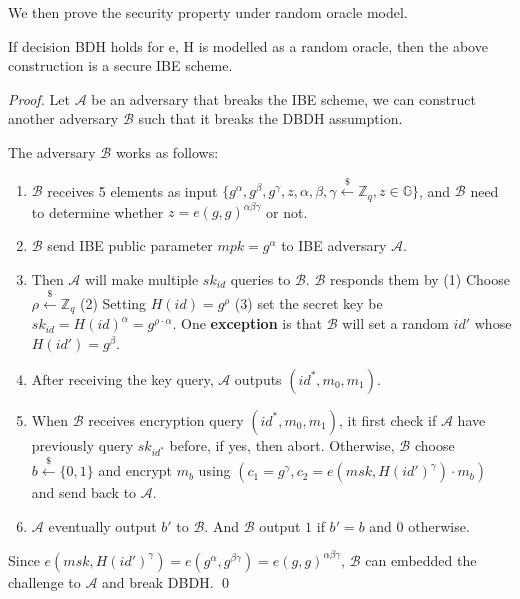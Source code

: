 We then prove the security property under random oracle model.
\begin{theorem}
    If decision BDH holds for e, H is modelled as a random oracle, then the above construction is a secure IBE scheme. 
\end{theorem}
\begin{proof}
    Let $\mathcal{A}$ be an adversary that breaks the IBE scheme, we can construct another adversary $\mathcal{B}$ such that it breaks the DBDH assumption.

    The adversary $\mathcal{B}$ works as follows:
    \begin{enumerate}
        \item $\mathcal{B}$ receives 5 elements as input $\{g^{\alpha},g^{\beta},g^{\gamma},z,  \alpha,\beta,\gamma\stackrel{\$}{\gets}\mathbb{Z}_q,z\in\mathbb{G}\}$, and $\mathcal{B}$ need to determine whether $z=e(g,g)^{\alpha\beta\gamma}$ or not. 
        \item $\mathcal{B}$ send IBE public parameter $mpk=g^{\alpha}$ to IBE adversary $\mathcal{A}$.
        \item Then $\mathcal{A}$ will make multiple $sk_{id}$ queries to $\mathcal{B}$. $\mathcal{B}$ responds them by (1) Choose $\rho\stackrel{\$}{\gets}\mathbb{Z}_q$ (2) Setting $H(id)=g^{\rho}$ (3) set the secret key be $sk_{id}=H(id)^{\alpha}=g^{\rho\cdot\alpha}$. One \textbf{exception} is that $\mathcal{B}$ will set a random $id'$ whose $H(id')=g^\beta$.
        \item After receiving the key query, $\mathcal{A}$ outputs $(id^{*}, m_0,m_1)$.  
        \item When $\mathcal{B}$ receives encryption query $(id^{*}, m_0, m_1)$, it first check if $\mathcal{A}$ have previously query $sk_{id^*}$ before, if yes, then abort. Otherwise, $\mathcal{B}$ choose $b\stackrel{\$}{\gets}\{0,1\}$ and encrypt $m_b$ using $(c_1=g^\gamma, c_2=e(msk,H(id')^\gamma)\cdot m_b)$ and send back to $\mathcal{A}$.
        \item $\mathcal{A}$ eventually output $b'$ to $\mathcal{B}$. And $\mathcal{B}$ output $1$ if $b'=b$ and $0$ otherwise. 
    \end{enumerate}
    Since $e(msk,H(id')^{\gamma})=e(g^\alpha,g^{\beta\gamma})=e(g,g)^{\alpha\beta\gamma}$, $\mathcal{B}$ can embedded the challenge to $\mathcal{A}$ and break DBDH. \qed
\end{proof}

